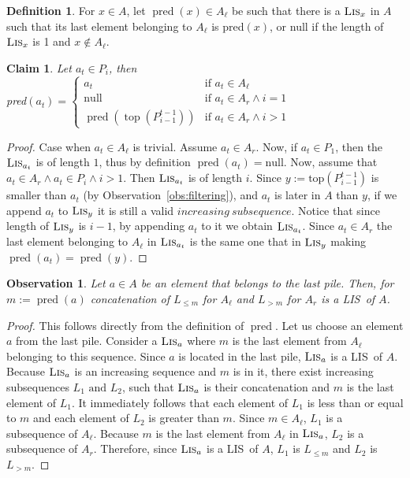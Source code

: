 \documentclass[lic, english, shortabstract]{iithesis}
\theoremstyle{plain}
\newcommand{\Lis}{\textsc{LIS}}
\newtheorem{claim}[theorem]{Claim}
\newtheorem{observation}[theorem]{Observation}
\theoremstyle{definition}
\newtheorem{definition}{Definition}[section]
\begin{document}
\begin{definition}
For $x \in A$, let $\operatorname{pred}(x) \in A_\ell$ be such that there is a $\textsc{Lis}_x$ in $A$
such that its last element belonging to $A_\ell$ is pred$(x)$, or null if the length of $\textsc{Lis}_x$ is 1 and $x \notin A_\ell$.
\end{definition}

\begin{claim} Let $a_t \in P_i$, then \\
pred$(a_t) = \begin{cases}
a_t & \text{if } a_t \in A_\ell \\
\text{null} & \text{if } a_t \in A_r \land i = 1 \\
\operatorname{pred}(\operatorname{top}(P_{i-1}^{t-1})) & \text{if } a_t \in A_r \land i > 1
\end{cases}$
\end{claim}

\begin{proof}
Case when $a_t \in A_\ell$ is trivial. Assume $a_t \in A_r$. Now, if $a_t \in P_1$, then the $\textsc{Lis}_{a_t}$ is of
length $1$, thus by definition $\operatorname{pred}(a_t) = \text{null}$. Now, assume that $a_t \in A_r \land a_t \in P_i \land i > 1$. Then  
$\textsc{Lis}_{a_t}$ is of length $i$. Since $y := \text{top}(P_{i-1}^{t-1})$ is smaller than $a_t$ (by Observation~\ref{obs:filtering}), and $a_t$ is later in $A$ than $y$, if we append $a_t$ to $\textsc{Lis}_y$ it is still a valid $increasing\ subsequence$.
Notice that since length of $\textsc{Lis}_y$ is $i-1$, by appending $a_t$ to it we obtain $\textsc{Lis}_{a_t}$. Since $a_t \in A_r$ the last element belonging to $A_\ell$ in $\textsc{Lis}_{a_t}$ is the same one that in $\textsc{Lis}_y$ making $\operatorname{pred}(a_t) = \operatorname{pred}(y)$.  
\end{proof}

\begin{observation}
Let $a \in A$ be an element that belongs to the last pile. 
Then, for $m := \operatorname{pred}(a)$ concatenation of $L_{\leq m}$ for $A_\ell$ and $L_{> m}$ for $A_r$ is a \Lis\ of $A$.
\end{observation}

\begin{proof}
This follows directly from the definition of $\operatorname{pred}$. Let us choose an element $a$ from the last pile. 
Consider a $\textsc{Lis}_a$ where $m$ is the last element from $A_\ell$ belonging to this sequence.
Since $a$ is located in the last pile, $\textsc{Lis}_a$ is a \Lis\ of $A$.
Because $\textsc{Lis}_a$ is an increasing sequence and $m$ is in it, there exist increasing subsequences $L_1 \text{ and } L_2$, such that $\textsc{Lis}_a$ is their concatenation and $m$ is the last element of $L_1$.
It immediately follows that each element of $L_1$ is less than or equal to $m$ and each element of $L_2$ is greater than $m$.
Since $m \in A_\ell$, $L_1$ is a subsequence of $A_\ell$. Because $m$ is the last element from $A_\ell$ in $\textsc{Lis}_a$, $L_2$ is a subsequence of $A_r$.
Therefore, since $\textsc{Lis}_a$ is a \Lis\ of $A$, $L_1$ is $L_{\leq m}$ and $L_2$ is $L_{> m}$.
\end{proof}
\end{document}

